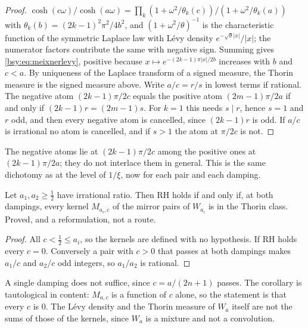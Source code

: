 \begin{proof}
$\cosh(c\omega)/\cosh(a\omega)=\prod_k(1+\omega^2/\theta_k(c))/(1+\omega^2/\theta_k(a))$ with $\theta_k(b)=(2k-1)^2\pi^2/4b^2$, and $(1+\omega^2/\theta)^{-1}$ is the characteristic function of the symmetric Laplace law with L\'evy density $e^{-\sqrt\theta|x|}/|x|$; the numerator factors contribute the same with negative sign. Summing gives \eqref{bsy:eq:meixnerlevy}, positive because $x\mapsto e^{-(2k-1)\pi|x|/2b}$ increases with $b$ and $c<a$. By uniqueness of the Laplace transform of a signed measure, the Thorin measure is the signed measure above. Write $a/c=r/s$ in lowest terms if rational. The negative atom $(2k-1)\pi/2c$ equals the positive atom $(2m-1)\pi/2a$ if and only if $(2k-1)r=(2m-1)s$. For $k=1$ this needs $s\mid r$, hence $s=1$ and $r$ odd, and then every negative atom is cancelled, since $(2k-1)r$ is odd. If $a/c$ is irrational no atom is cancelled, and if $s>1$ the atom at $\pi/2c$ is not.
\end{proof}

The negative atoms lie at $(2k-1)\pi/2c$ among the positive ones at $(2k-1)\pi/2a$; they do not interlace them in general. This is the same dichotomy as at the level of $1/\xi$, now for each pair and each damping.

\begin{corollary}[a reformulation of RH]\label{bsy:cor:reform}
Let $a_1,a_2\ge\frac12$ have irrational ratio. Then RH holds if and only if, at both dampings, every kernel $M_{a_i,c}$ of the mirror pairs of $W_{a_i}$ is in the Thorin class. Proved, and a reformulation, not a route.
\end{corollary}

\begin{proof}
All $c<\frac12\le a_i$, so the kernels are defined with no hypothesis. If RH holds every $c=0$. Conversely a pair with $c>0$ that passes at both dampings makes $a_1/c$ and $a_2/c$ odd integers, so $a_1/a_2$ is rational.
\end{proof}

A single damping does not suffice, since $c=a/(2n+1)$ passes. The corollary is tautological in content: $M_{a,c}$ is a function of $c$ alone, so the statement is that every $c$ is $0$. The L\'evy density and the Thorin measure of $W_a$ itself are not the sums of those of the kernels, since $W_a$ is a mixture and not a convolution.

